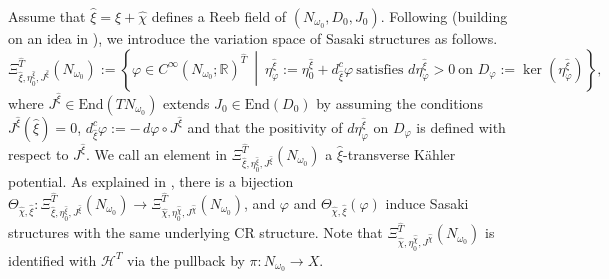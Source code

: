 \documentclass[12pt]{amsart}
\numberwithin{equation}{section}%
\theoremstyle{plain}
\theoremstyle{definition}
\renewcommand{\phi}{\varphi}
\newcommand{\1}{\mathbf{1}}
\begin{document}
Assume that $\hat{\xi}=\xi+\hat{\chi}$ defines a Reeb field
of $(N_{\omega_{0}},D_{0},J_{0})$.
Following \cite[Section 2.3]{ACL21}
(building on an idea in \cite[Proof of Lemma 2.2]{HS16}),
we introduce the variation space of Sasaki structures as follows.
\begin{equation}
\Xi_{\hat{\xi},\eta^{\hat{\xi}}_{0},J^{\hat{\xi}}}^{\hat{T}}(N_{\omega_{0}})
:=
\left\{
\varphi\in C^{\infty}(N_{\omega_{0}};\mathbb{R})^{\hat{T}}
\ \middle|\
\eta^{\hat{\xi}}_{\varphi}
:=
\eta^{\hat{\xi}}_{0}+d^{c}_{\hat{\xi}}\varphi
\ \text{satisfies } 
d\eta^{\hat{\xi}}_{\varphi}>0
\ \text{on }D_{\varphi}:=\ker(\eta^{\hat{\xi}}_{\varphi})
\right\},
\tag{KRS11}
\end{equation}
where $J^{\hat{\xi}}\in\mathrm{End}(TN_{\omega_{0}})$ extends
$J_{0}\in\mathrm{End}(D_{0})$ by assuming the conditions
$J^{\hat{\xi}}(\hat{\xi})=0$,
$
d^{c}_{\hat{\xi}}\varphi := -\,d\varphi\circ J^{\hat{\xi}}
$
and that the positivity of $d\eta^{\hat{\xi}}_{\varphi}$ on $D_{\varphi}$
is defined with respect to $J^{\hat{\xi}}$.
We call an element in
$\Xi_{\hat{\xi},\eta^{\hat{\xi}}_{0},J^{\hat{\xi}}}^{\hat{T}}(N_{\omega_{0}})$
a $\hat{\xi}$-transverse K\"ahler potential.
As explained in \cite[Section 2.3]{ACL21},
there is a bijection $\Theta_{\hat{\chi},\hat{\xi}}:
\Xi_{\hat{\xi},\eta^{\hat{\xi}}_{0},J^{\hat{\xi}}}^{\hat{T}}(N_{\omega_{0}})
\to
\Xi_{\hat{\chi},\eta^{\hat{\chi}}_{0},J^{\hat{\chi}}}^{\hat{T}}(N_{\omega_{0}})$,
and $\phi$ and $\Theta_{\hat{\chi},\hat{\xi}}(\phi)$ induce Sasaki structures
with the same underlying CR structure.
Note that 
$\Xi_{\hat{\chi},\eta^{\hat{\chi}}_{0},J^{\hat{\chi}}}^{\hat{T}}(N_{\omega_{0}})$
is identified with $\mathcal{H}^{T}$ via the pullback by $\pi:N_{\omega_{0}}\to X$. 
\end{document}
